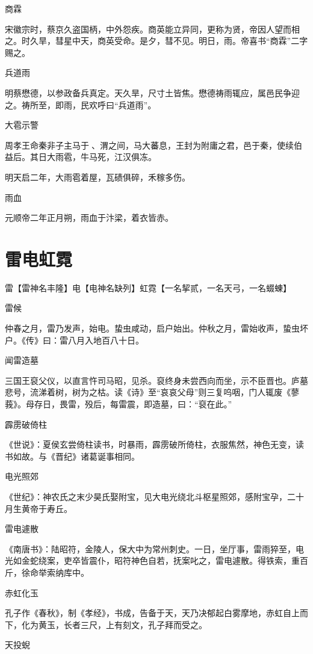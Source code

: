 \documentclass[a4paper,12pt,UTF8,twoside]{ctexbook}
\begin{document}
	商霖
	
	宋徽宗时，蔡京久盗国柄，中外怨疾。商英能立异同，更称为贤，帝因人望而相之。时久旱，彗星中天，商英受命。是夕，彗不见。明日，雨。帝喜书“商霖”二字赐之。
	
	兵道雨
	
	明蔡懋德，以参政备兵真定。天久旱，尺寸土皆焦。懋德祷雨辄应，属邑民争迎之。祷所至，即雨，民欢呼曰“兵道雨”。
	
	大雹示警
	
	周孝王命秦非子主马于、渭之间，马大蕃息，王封为附庸之君，邑于秦，使续伯益后。其日大雨雹，牛马死，江汉俱冻。
	
	明天启二年，大雨雹着屋，瓦碛俱碎，禾稼多伤。
	
	雨血
	
	元顺帝二年正月朔，雨血于汴梁，着衣皆赤。
    
	
	\chapter{雷电虹霓}
	
	雷【雷神名丰隆】电【电神名缺列】虹霓【一名挈贰，一名天弓，一名蝃蝀】
	
	雷候
	
	仲春之月，雷乃发声，始电。蛰虫咸动，启户始出。仲秋之月，雷始收声，蛰虫坏户。《传》曰：雷八月入地百八十日。
	
	闻雷造墓
	
	三国王裒父仪，以直言忤司马昭，见杀。裒终身未尝西向而坐，示不臣晋也。庐墓悲号，流涕着树，树为之枯。读《诗》至“哀哀父母”则三复呜咽，门人辄废《蓼莪》。母存日，畏雷，殁后，每雷震，即造墓，曰：“裒在此。”
	
	霹雳破倚柱
	
	《世说》：夏侯玄尝倚柱读书，时暴雨，霹雳破所倚柱，衣服焦然，神色无变，读书如故。与《晋纪》诸葛诞事相同。
	
	电光照郊
	
	《世纪》：神农氏之末少昊氏娶附宝，见大电光绕北斗枢星照郊，感附宝孕，二十月生黄帝于寿丘。
	
	雷电遽散
	
	《南唐书》：陆昭符，金陵人，保大中为常州刺史。一日，坐厅事，雷雨猝至，电光如金蛇绕案，吏卒皆震仆，昭符神色自若，抚案叱之，雷电遽散。得铁索，重百斤，徐命举索纳库中。
	
	赤虹化玉
	
	孔子作《春秋》，制《孝经》，书成，告备于天，天乃决郁起白雾摩地，赤虹自上而下，化为黄玉，长者三尺，上有刻文，孔子拜而受之。
	
	天投蜺
	
\end{document}
